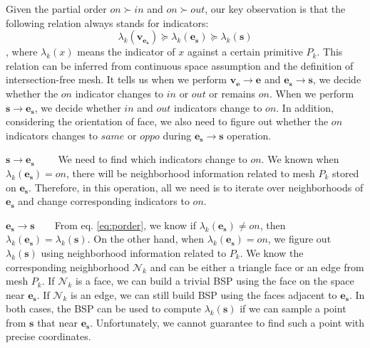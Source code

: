 \documentclass[10pt,journal,compsoc]{IEEEtran}
\begin{document}
Given the partial order $on \succ in$ and $on \succ out$, our key observation is that the following relation always stands for indicators:
\begin{equation}
\label{eq:porder}
\lambda_k(\bm{v}_{\bm{e}_{\bm{s}}}) \succeq \lambda_k(\bm{e}_{\bm{s}}) \succeq \lambda_k(\bm{s})
\end{equation}
, where $\lambda_k(x)$ means the indicator of $x$ against a certain primitive $P_k$. This relation can be inferred from continuous space assumption and the definition of intersection-free mesh. It tells us when we perform $\bm{v}_{\bm{e}}\to \bm{e}$ and $\bm{e}_{\bm{s}}\to \bm{s}$, we decide whether the $on$ indicator changes to $in$ or $out$ or remains $on$. When we perform $\bm{s}\to \bm{e}_{\bm{s}}$, we decide whether $in$ and $out$ indicators change to $on$. In addition, considering the orientation of face, we also need to figure out whether the $on$ indicators changes to $same$ or $oppo$ during $\bm{e}_{\bm{s}}\to \bm{s}$ operation.

\vspace{0.5em}
\noindent\textbf{$\bm{s\to \bm{e}_{\bm{s}}}$}~~~~ We need to find which indicators change to $on$. We known when $\lambda_k(\bm{e}_{\bm{s}})=on$, there will be neighborhood information related to mesh $P_k$ stored on $\bm{e}_{\bm{s}}$. Therefore, in this operation, all we need is to iterate over neighborhoods of $\bm{e}_{\bm{s}}$ and change corresponding indicators to $on$.


\vspace{0.5em}
\noindent\textbf{$\bm{\bm{e}_{\bm{s}}\to \bm{s}}$}~~~~From eq. \ref{eq:porder}, we know if $\lambda_k(\bm{e}_{\bm{s}}) \neq on$, then $\lambda_k(\bm{e}_{\bm{s}})=\lambda_k(\bm{s})$. On the other hand, when $\lambda_k(\bm{e}_{\bm{s}}) = on$, we figure out $\lambda_k(\bm{s})$ using neighborhood information related to $P_k$. We know the corresponding neighborhood $\mathcal{N}_k$ and can be either a triangle face or an edge from mesh $P_k$. If $\mathcal{N}_k$ is a face, we can build a trivial BSP \cite{thibault1987set} using the face on the space near $\bm{e}_{\bm{s}}$. If $\mathcal{N}_k$ is an edge, we can still build BSP using the faces adjacent to $\bm{e}_{\bm{s}}$. In both cases, the BSP can be used to compute $\lambda_k(\bm{s})$ if we can sample a point from $\bm{s}$ that near $\bm{e}_{\bm{s}}$. Unfortunately, we cannot guarantee to find such a point with precise coordinates.
\end{document}
